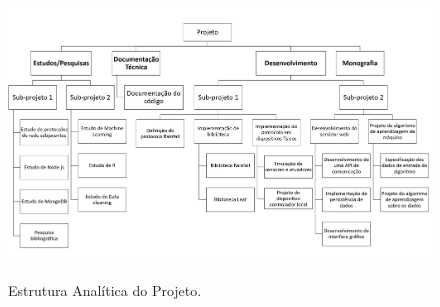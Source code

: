 \begin{figure}[h]
	\centering
	\caption{Estrutura Analítica do Projeto.}
  \includegraphics[width=\textwidth]{imagens/eap.png}
  \label{fig:eap}  
\end{figure}
